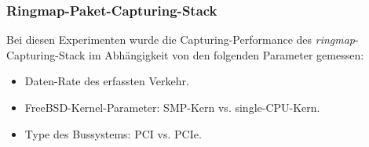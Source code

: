 \subsubsection{Ringmap-Paket-Capturing-Stack}\label{sec:erg_ringmap_stack}
Bei diesen Experimenten wurde die Capturing-Performance des \emph{ringmap}-Capturing-Stack
im Abhängigkeit von den folgenden Parameter gemessen: 
\begin{itemize}
	\item Daten-Rate des erfassten Verkehr.
	\item FreeBSD-Kernel-Parameter: SMP-Kern vs. single-CPU-Kern.
	\item Type des Bussystems: PCI vs. PCIe.
\end{itemize}

